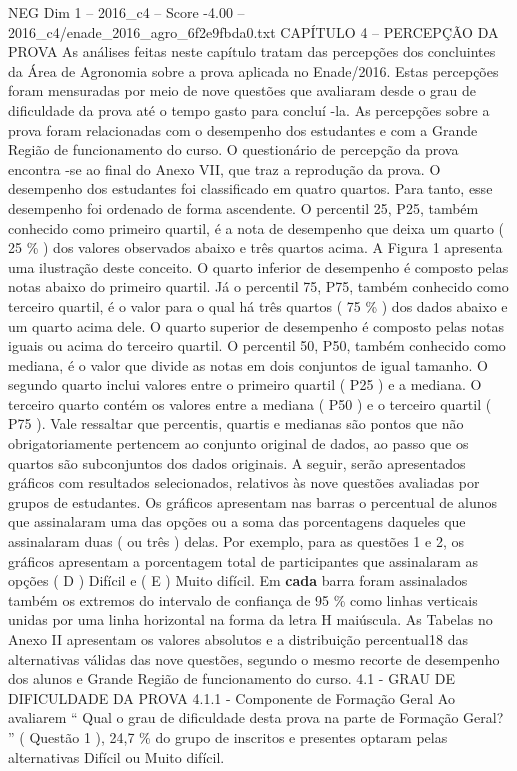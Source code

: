 \begin{textsample}{NEG Dim 1 – 2016\_c4 – Score -4.00 – 2016\_c4/enade\_2016\_agro\_6f2e9fbda0.txt}  \label{ex:f1_neg_159}
CAPÍTULO 4 – PERCEPÇÃO DA PROVA As análises feitas neste capítulo tratam das percepções dos concluintes da Área de Agronomia sobre a prova aplicada no Enade/2016.
Estas percepções foram mensuradas por meio de nove questões que avaliaram desde o grau de dificuldade da prova até o tempo gasto para concluí -la.
As percepções sobre a prova foram relacionadas com o desempenho dos estudantes e com a Grande Região de funcionamento do curso.
O questionário de percepção da prova encontra -se ao final do Anexo VII, que traz a reprodução da prova.
O desempenho dos estudantes foi classificado em quatro quartos.
Para tanto, esse desempenho foi ordenado de forma ascendente.
O percentil 25, P25, também conhecido como primeiro quartil, é a nota de desempenho que deixa um quarto ( 25 \% ) dos valores observados abaixo e três quartos acima.
A Figura 1 apresenta uma ilustração deste conceito.
O quarto inferior de desempenho é composto pelas notas abaixo do primeiro quartil.
Já o percentil 75, P75, também conhecido como terceiro quartil, é o valor para o qual há três quartos ( 75 \% ) dos dados abaixo e um quarto acima dele.
O quarto superior de desempenho é composto pelas notas iguais ou acima do terceiro quartil.
O percentil 50, P50, também conhecido como mediana, é o valor que divide as notas em dois conjuntos de igual tamanho.
O segundo quarto inclui valores entre o primeiro quartil ( P25 ) e a mediana.
O terceiro quarto contém os valores entre a mediana ( P50 ) e o terceiro quartil ( P75 ).
Vale ressaltar que percentis, quartis e medianas são pontos que não obrigatoriamente pertencem ao conjunto original de dados, ao passo que os quartos são subconjuntos dos dados originais.
A seguir, serão apresentados gráficos com resultados selecionados, relativos às nove questões avaliadas por grupos de estudantes.
Os gráficos apresentam nas barras o percentual de alunos que assinalaram uma das opções ou a soma das porcentagens daqueles que assinalaram duas ( ou três ) delas.
Por exemplo, para as questões 1 e 2, os gráficos apresentam a porcentagem total de participantes que assinalaram as opções ( D ) Difícil e ( E ) Muito difícil.
Em \textbf{cada} barra foram assinalados também os extremos do intervalo de confiança de 95 \% como linhas verticais unidas por uma linha horizontal na forma da letra H maiúscula.
As Tabelas no Anexo II apresentam os valores absolutos e a distribuição percentual18 das alternativas válidas das nove questões, segundo o mesmo recorte de desempenho dos alunos e Grande Região de funcionamento do curso. 4.1 - GRAU DE DIFICULDADE DA PROVA 4.1.1 - Componente de Formação Geral Ao avaliarem “ Qual o grau de dificuldade desta prova na parte de Formação Geral? ” ( Questão 1 ), 24,7 \% do grupo de inscritos e presentes optaram pelas alternativas Difícil ou Muito difícil.

\end{textsample}
